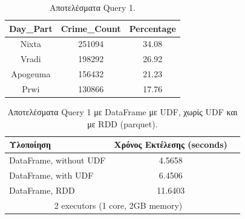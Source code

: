 \documentclass[12pt, a4paper]{article}
\begin{document}





\begin{table}[h]
\centering
\begin{tabular}{ccc} 

Day\_Part & Crime\_Count & Percentage \\ 
\hline
Nixta    & 251094 &  34.08 \\ 
Vradi    & 198292 &  26.92 \\
Apogeuma & 156432 &  21.23 \\
Prwi     & 130866 &  17.76 \\
\hline
\end{tabular}
\caption{Αποτελέσματα Query 1.}
\label{q1_results}
\end{table}


\begin{table}[h!]
\centering
\begin{tabular}{lcc} 

Υλοποίηση & Χρόνος Εκτέλεσης (seconds) \\ 
\hline
DataFrame, without UDF &  4.5658 \\
DataFrame, with UDF    &  6.4506 \\
DataFrame, RDD         &  11.6403 \\

\hline
\multicolumn{2}{c}{2 executors (1 core, 2GB memory)}
\end{tabular}
\caption{Αποτελέσματα Query 1 με DataFrame με UDF, χωρίς UDF και με RDD (parquet).}
\label{q1_results_all_parquet}
\end{table}
\end{document}
